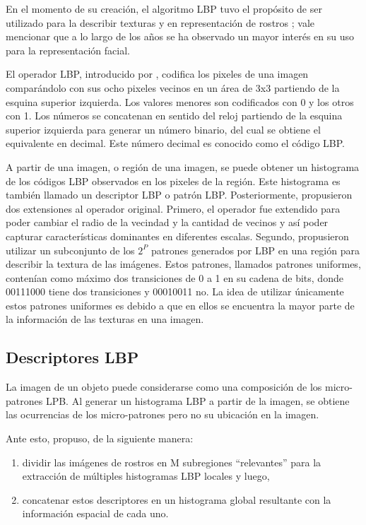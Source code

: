 En el momento de su creación, el algoritmo LBP tuvo el propósito de ser utilizado para la describir texturas y en representación de rostros \parencite{Ahonen2006-gg}; vale mencionar que a lo largo de los años se ha observado un mayor interés en su uso para la representación facial.

El operador LBP, introducido por \parencite{Ojala1996-el}, codifica los pixeles de una imagen comparándolo con sus ocho pixeles vecinos en un área de 3x3 partiendo de la esquina superior izquierda. Los valores menores son codificados con 0 y los otros con 1. Los números se concatenan en sentido del reloj partiendo de la esquina superior izquierda para generar un número binario, del cual se obtiene el equivalente en decimal. Este número decimal es conocido como el código LBP. 

A partir de una imagen, o región de una imagen, se puede obtener un histograma de los códigos LBP observados en los pixeles de la región. Este histograma es también llamado un descriptor LBP o patrón LBP.
Posteriormente, \parencite{Ojala2002-pl} propusieron dos extensiones al operador original. Primero, el operador fue extendido para poder cambiar el radio de la vecindad y la cantidad de vecinos y así poder capturar características dominantes en diferentes escalas. Segundo, propusieron utilizar un subconjunto de los $2^P$ patrones generados por LBP en una región para describir la textura de las imágenes. Estos patrones, llamados patrones uniformes, contenían como máximo dos transiciones de 0 a 1 en su cadena de bits, donde 00111000 tiene dos transiciones y 00010011 no. La idea de utilizar únicamente estos patrones uniformes es debido a que en ellos se encuentra la mayor parte de la información de las texturas en una imagen. 

\subsection{Descriptores LBP}
La imagen de un objeto puede considerarse como una composición de los micro-patrones LPB. Al generar un histograma LBP a partir de la imagen, se obtiene las ocurrencias de los micro-patrones pero no su ubicación en la imagen. 

Ante esto, \parencite{Ahonen2006-gg} propuso, de la siguiente manera:
\begin{enumerate}
    \item dividir las imágenes de rostros en M subregiones “relevantes” para la extracción de múltiples histogramas LBP locales y luego, 
    \item concatenar estos descriptores en un histograma global resultante con la información espacial de cada uno.

\end{enumerate}

